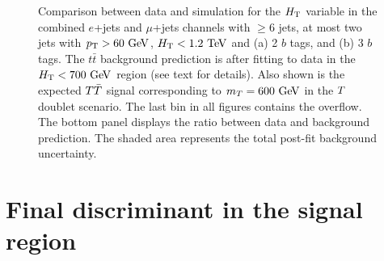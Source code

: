 \begin{figure}[htb]\begin{center}
	\caption{Comparison between data and simulation for the $\HT$ variable 
        in the combined
        $e$+jets and $\mu$+jets channels with $\geq 6$ jets, at most two jets with $\pt>60\gev$,
        $\HT<1.2\tev$ and (a) 2 $b$ tags, and (b) 3 $b$ tags.
        The $t\bar{t}$ background prediction is after fitting to data in the $\HT<700\gev$ region (see text for details).
        Also shown is the expected $\TT$ signal corresponding to $m_{\T}=600\gev$ in the $\T$ doublet scenario.
        The last bin in all figures contains the overflow. The bottom panel displays the ratio between data
        and background prediction. The shaded area represents the total post-fit background uncertainty.  
\label{fig:HT_signalregion_control}}
\end{center}\end{figure}


\section{Final discriminant in the signal region}\label{sec:htxDISCR}


